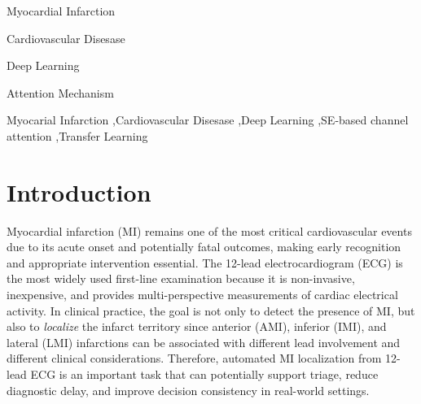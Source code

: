 \documentclass[preprint,12pt]{elsarticle}
\begin{document}
\begin{frontmatter}
\begin{graphicalabstract}
\end{graphicalabstract}

\begin{highlights}
\item Myocardial Infarction
\item Cardiovascular Disesase
\item Deep Learning
\item Attention Mechanism
\end{highlights}

\begin{keyword}
 
Myocarial Infarction \sep Cardiovascular Disesase \sep Deep Learning \sep  SE-based channel attention \sep Transfer Learning



\end{keyword}

\end{frontmatter}



\section{Introduction}
Myocardial infarction (MI) remains one of the most critical cardiovascular events due to its acute onset and potentially fatal outcomes, making early recognition and appropriate intervention essential. The 12-lead electrocardiogram (ECG) is the most widely used first-line examination because it is non-invasive, inexpensive, and provides multi-perspective measurements of cardiac electrical activity. In clinical practice, the goal is not only to detect the presence of MI, but also to \emph{localize} the infarct territory since anterior (AMI), inferior (IMI), and lateral (LMI) infarctions can be associated with different lead involvement and different clinical considerations. Therefore, automated MI localization from 12-lead ECG is an important task that can potentially support triage, reduce diagnostic delay, and improve decision consistency in real-world settings.
\end{document}

